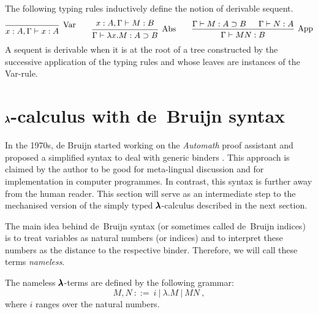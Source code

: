 \begin{definition}
  \label{typing_rules}
  The following typing rules inductively define the notion of derivable sequent.
  \[
    \begin{prooftree}
      \infer0[Var]{ x:A, \Gamma \vdash x:A } 
    \end{prooftree}
    \qquad
    \begin{prooftree}
      \hypo{ x:A, \Gamma \vdash M:B }
      \infer1[Abs]{ \Gamma \vdash \lambda x . M : A \supset B  } 
    \end{prooftree}
    \qquad
    \begin{prooftree}
      \hypo{ \Gamma \vdash M : A \supset B }
      \hypo{ \Gamma \vdash N : A }	
      \infer2[App]{ \Gamma \vdash M N : B } 
    \end{prooftree}
  \]
  A sequent is derivable when it is at the root of a tree constructed by the successive application of the typing rules and whose leaves are instances of the Var-rule.  
\end{definition}


\section{$\pmb{\lambda}$-calculus with de~Bruijn syntax}

In the 1970s, de Bruijn started working on the \textit{Automath} proof assistant and proposed a simplified syntax to deal with generic binders \cite{deBruijn}.
This approach is claimed by the author to be good for meta-lingual discussion and for implementation in computer programmes.
In contrast, this syntax is further away from the human reader.
This section will serve as an intermediate step to the mechanised version of the simply typed $\pmb{\lambda}$-calculus described in the next section.

The main idea behind de~Bruijn syntax (or sometimes called de~Bruijn indices) is to treat variables as natural numbers (or indices) and to interpret these numbers as the distance to the respective binder.
Therefore, we will call these terms \textit{nameless}. 

\begin{definition}
  The nameless $\pmb{\lambda}$-terms are defined by the following grammar:
  \[ M, N \ ::= \ i \ | \ \lambda . M \ | \ M N \ , \]  
  where $i$ ranges over the natural numbers.
\end{definition}

